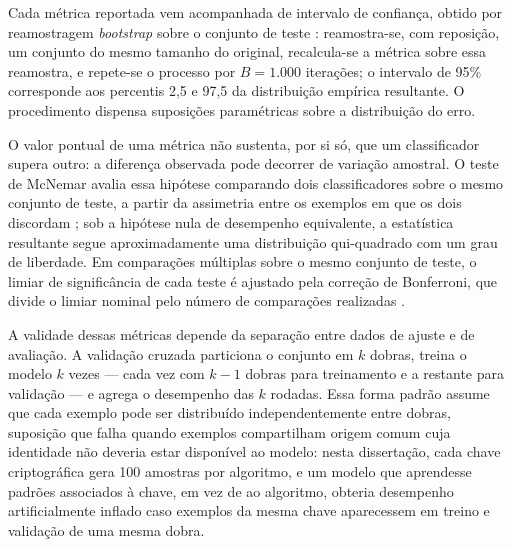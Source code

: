 Cada métrica reportada vem acompanhada de intervalo de confiança, obtido por reamostragem \emph{bootstrap} sobre o conjunto de teste \cite{efron1994}: reamostra-se, com reposição, um conjunto do mesmo tamanho do original, recalcula-se a métrica sobre essa reamostra, e repete-se o processo por $B=1.000$ iterações; o intervalo de 95\% corresponde aos percentis 2,5 e 97,5 da distribuição empírica resultante. O procedimento dispensa suposições paramétricas sobre a distribuição do erro.

O valor pontual de uma métrica não sustenta, por si só, que um classificador supera outro: a diferença observada pode decorrer de variação amostral. O teste de McNemar avalia essa hipótese comparando dois classificadores sobre o mesmo conjunto de teste, a partir da assimetria entre os exemplos em que os dois discordam \cite{mcnemar1947}; sob a hipótese nula de desempenho equivalente, a estatística resultante segue aproximadamente uma distribuição qui-quadrado com um grau de liberdade. Em comparações múltiplas sobre o mesmo conjunto de teste, o limiar de significância de cada teste é ajustado pela correção de Bonferroni, que divide o limiar nominal pelo número de comparações realizadas \cite{dunn1961}.

A validade dessas métricas depende da separação entre dados de ajuste e de avaliação. A validação cruzada particiona o conjunto em $k$ dobras, treina o modelo $k$ vezes --- cada vez com $k-1$ dobras para treinamento e a restante para validação --- e agrega o desempenho das $k$ rodadas. Essa forma padrão assume que cada exemplo pode ser distribuído independentemente entre dobras, suposição que falha quando exemplos compartilham origem comum cuja identidade não deveria estar disponível ao modelo: nesta dissertação, cada chave criptográfica gera 100 amostras por algoritmo, e um modelo que aprendesse padrões associados à chave, em vez de ao algoritmo, obteria desempenho artificialmente inflado caso exemplos da mesma chave aparecessem em treino e validação de uma mesma dobra.

